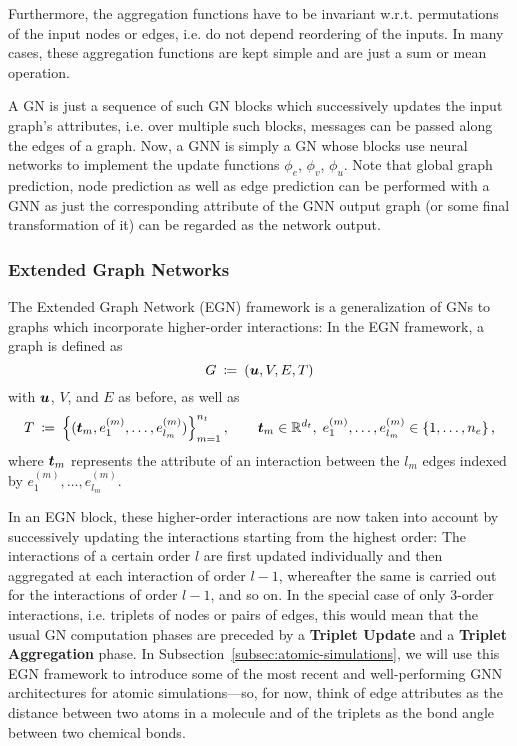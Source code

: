 Furthermore, the aggregation functions have to be invariant w.r.t. permutations of the
input nodes or edges, i.e. do not depend reordering of the inputs. In many cases,
these aggregation functions are kept simple and are just a sum or mean operation.

A GN is just a sequence of such GN blocks which successively updates the input graph's
attributes, i.e. over multiple such blocks, messages can be passed along the edges of
a graph. Now, a GNN is simply a GN whose blocks use neural networks to implement the
update functions $\phi_e$, $\phi_v$, $\phi_u$. Note that global graph prediction, 
node prediction as well as edge prediction can be performed with a GNN as just
the corresponding attribute of the GNN output graph (or some final transformation of it) can 
be regarded as the network output.



\subsubsection{Extended Graph Networks}
\label{subsubsec:egns}

The Extended Graph Network (EGN) framework \cite[Section 2.1]{https://doi.org/10.48550/arxiv.2203.09697}
 is a generalization of GNs to graphs which 
incorporate higher-order interactions: In the EGN framework, a graph is defined as
\[ G \: \coloneqq \: (\boldsymbol{u}, V, E, T) \]
with $\boldsymbol{u}$, $V$, and $E$ as before, as well as
\begin{equation} 
    T \: \coloneqq \: \left\{(\boldsymbol{t}_m, e_1^{(m)}, \dots, e_{l_m}^{(m)})\right\}_{m=1}^{n_t}, 
    \qquad \boldsymbol{t}_m \in \mathbb{R}^{d_t}, \; 
    e_1^{(m)}, \dots, e_{l_m}^{(m)} \in \left\{1, \dots, n_e\right\} \text{,} 
    \label{eq:higher_order_interact}
\end{equation}
where $\boldsymbol{t}_m$ represents the attribute of an interaction between the $l_m$ edges indexed 
by $e_1^{(m)}, \dots, e_{l_m}^{(m)}$. 

In an EGN block, these higher-order interactions are now taken into account by 
successively updating the interactions starting from the highest order: The interactions
of a certain order $l$ are first updated individually and then aggregated at each
interaction of order $l-1$, whereafter the same is carried out for the interactions
of order $l-1$, and so on. In the special case of only $3$-order interactions, i.e.
triplets of nodes or pairs of edges, this would mean that the usual GN computation 
phases are preceded by a \textbf{Triplet Update} and a \textbf{Triplet Aggregation}
phase. In Subsection~\ref{subsec:atomic-simulations}, we will use this EGN framework
to introduce some of the most recent and well-performing GNN architectures for atomic 
simulations---so, for now, think of edge attributes as the distance between two
atoms in a molecule and of the triplets as the bond angle between two chemical bonds.